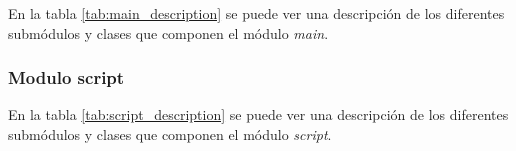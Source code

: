 En la tabla \ref{tab:main_description} se puede ver una descripción de los diferentes submódulos y clases que
componen el módulo \textit{main}.

\begin{table}[H]
    \centering
    \caption{Descripción de los submódulos y clases que componen el módulo main}
    \label{tab:main_description}
\end{table}

\subsubsection{Modulo script}
\label{subsubsec:modulo_script}

En la tabla \ref{tab:script_description} se puede ver una descripción de los diferentes submódulos y clases que
componen el módulo \textit{script}.

